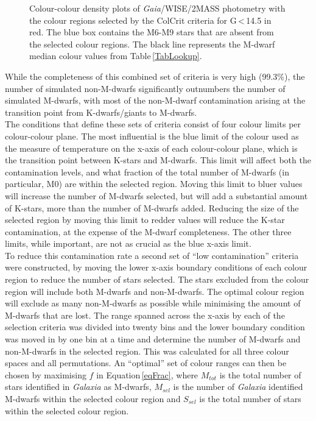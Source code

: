 \begin{figure}
    \caption{Colour-colour density plots of {\em Gaia}/WISE/2MASS photometry with the colour regions selected by the ColCrit criteria for G\,\textless\,14.5 in red. The blue box contains the M6-M9 stars that are absent from the selected colour regions. The black line represents the M-dwarf median colour values from Table\,\ref{TabLookup}.}
	\label{figBox}
\end{figure}
While the completeness of this combined set of criteria is very high (99.3\%), the number of simulated non-M-dwarfs significantly outnumbers the number of simulated M-dwarfs, with most of the non-M-dwarf contamination arising at the transition point from K-dwarfs/giants to M-dwarfs.\\

The conditions that define these sets of criteria consist of four colour limits per colour-colour plane. The most influential is the blue limit of the colour used as the measure of temperature on the x-axis of each colour-colour plane, which is the transition point between K-stars and M-dwarfs. This limit will affect both the contamination levels, and what fraction of the total number of M-dwarfs (in particular, M0) are within the selected region. Moving this limit to bluer values will increase the number of M-dwarfs selected, but will add a substantial amount of K-stars, more than the number of M-dwarfs added. Reducing the size of the selected region by moving this limit to redder values will reduce the K-star contamination, at the expense of the M-dwarf completeness. The other three limits, while important, are not as crucial as the blue x-axis limit.\\

To reduce this contamination rate a second set of ``low contamination'' criteria were constructed, by moving the lower x-axis boundary conditions of each colour region to reduce the number of stars selected. The stars excluded from the colour region will include both M-dwarfs and non-M-dwarfs. The optimal colour region will exclude as many non-M-dwarfs as possible while minimising the amount of M-dwarfs that are lost. The range spanned across the x-axis by each of the selection criteria was divided into twenty bins and the lower boundary condition was moved in by one bin at a time and determine the number of M-dwarfs and non-M-dwarfs in the selected region. This was calculated for all three colour spaces and all permutations. An ``optimal'' set of colour ranges can then be chosen by maximising $f$ in Equation\,\ref{eqFrac}, where $M_{tot}$ is the total number of stars identified in {\em Galaxia} as M-dwarfs, $M_{sel}$ is the number of {\em Galaxia} identified M-dwarfs within the selected colour region and $S_{sel}$ is the total number of stars within the selected colour region.\\

